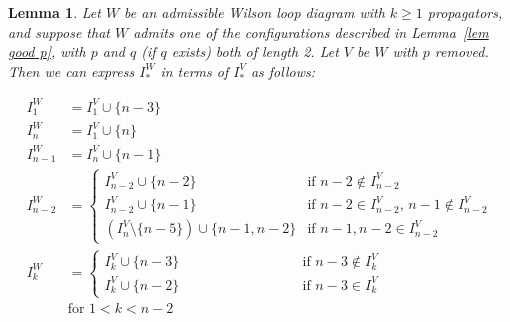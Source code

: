 \documentclass[11pt]{article}
\newtheorem{lem}[thm]{Lemma}
\theoremstyle{remark}
\theoremstyle{definition}
\begin{document}
\begin{lem}\label{lem I}
Let $W$ be an admissible Wilson loop diagram with $k\geq 1$ propagators, and suppose that $W$ admits one of the configurations described in Lemma~\ref{lem good p}, with $p$ and $q$ (if $q$ exists) both of length 2. Let $V$ be $W$ with $p$ removed.  Then we can express $I_*^W$ in terms of $I_*^V$ as follows:

  \begin{align*}
    I_1^{W} & = I_1^{V} \cup \{n-3\} \\
    I_n^{W} & = I_1^{V} \cup \{n\} \\
    I_{n-1}^{W} & = I_n^{V} \cup \{n-1\} \\
    I_{n-2}^{W} & =
    \begin{cases}
      I_{n-2}^{V}\cup \{n-2\} & \text{if $n-2\not\in I_{n-2}^{V}$} \\
      I_{n-2}^{V}\cup \{n-1\} & \text{if $n-2\in I_{n-2}^{V}$, $n-1\not\in I_{n-2}^{V}$} \\
      (I_{n}^{V} \setminus \{n-5\})\cup \{n-1,n-2\} & \text{if $n-1, n-2\in I_{n-2}^{V}$}
    \end{cases} \\
    I_{k}^{W} & =
    \begin{cases}
      I_k^{V}\cup \{n-3\} & \qquad \qquad \qquad \qquad \text{if $n-3 \not\in I_k^{V}$}\\
      I_k^{V}\cup\{n-2\} & \qquad \qquad \qquad \qquad \text{if $n-3\in I_k^{V}$}
    \end{cases} \\
    & \text{for $1<k<n-2$}
  \end{align*}
\end{lem}
\end{document}
